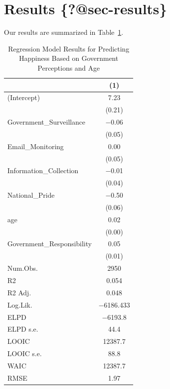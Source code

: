 \documentclass[
  letterpaper,
  DIV=11,
  numbers=noendperiod]{scrartcl}
\begin{document}
\hypertarget{results-sec-results}{%
\section{\texorpdfstring{Results
\{\textbf{?@sec-results}\}}{Results \{?@sec-results\}}}\label{results-sec-results}}

Our results are summarized in Table~\ref{tbl-modelresults}.

\hypertarget{tbl-modelresults}{}
\begin{table}
\caption{\label{tbl-modelresults}Regression Model Results for Predicting Happiness Based on Government
Perceptions and Age }\tabularnewline

\centering
\begin{tabular}[t]{lc}
\toprule
  & (1)\\
\midrule
(Intercept) & \num{7.23}\\
 & (\num{0.21})\\
Government\_Surveillance & \num{-0.06}\\
 & \vphantom{1} (\num{0.05})\\
Email\_Monitoring & \num{0.00}\\
 & (\num{0.05})\\
Information\_Collection & \num{-0.01}\\
 & (\num{0.04})\\
National\_Pride & \num{-0.50}\\
 & (\num{0.06})\\
age & \num{0.02}\\
 & (\num{0.00})\\
Government\_Responsibility & \num{0.05}\\
 & (\num{0.01})\\
\midrule
Num.Obs. & \num{2950}\\
R2 & \num{0.054}\\
R2 Adj. & \num{0.048}\\
Log.Lik. & \num{-6186.433}\\
ELPD & \num{-6193.8}\\
ELPD s.e. & \num{44.4}\\
LOOIC & \num{12387.7}\\
LOOIC s.e. & \num{88.8}\\
WAIC & \num{12387.7}\\
RMSE & \num{1.97}\\
\bottomrule
\end{tabular}
\end{table}
\end{document}
